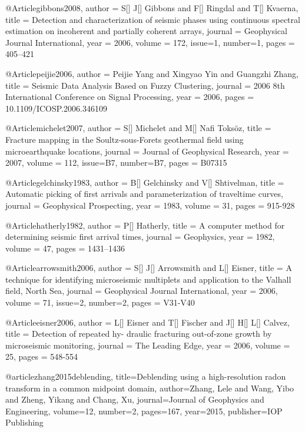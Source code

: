    @Article{gibbons2008,
  author = 	 {S[] J[] Gibbons and F[] Ringdal and T[] Kvaerna},
  title = 	 {Detection and characterization of seismic phases using continuous spectral estimation on incoherent and partially coherent arrays},
  journal = 	 {Geophysical Journal International},
  year = 	 2006,
  volume = 	 172,
  issue=1,
  number=1,
  pages = 	 {405–421}} 
  
   @Article{peijie2006,
  author = 	 {Peijie Yang and Xingyao Yin and Guangzhi Zhang},
  title = 	 {Seismic Data Analysis Based on Fuzzy Clustering},
  journal = 	 {2006 8th International Conference on Signal Processing},
  year = 	 2006,
  pages = 	 {10.1109/ICOSP.2006.346109}} 

    @Article{michelet2007,
  author = 	 {S[] Michelet and M[] Nafi Toks\"{o}z},
  title = 	 {Fracture mapping in the Soultz-sous-Forets geothermal field using microearthquake locations},
  journal = 	 {Journal of Geophysical Research},
  year = 	 2007,
  volume = 	 112,
  issue=B7,
  number=B7,
  pages = 	 {B07315}} 
 
    @Article{gelchinsky1983,
  author = 	 {B[] Gelchinsky and V[] Shtivelman},
  title = 	 {Automatic picking of first arrivals and parameterization of traveltime curves},
  journal = 	 {Geophysical Prospecting},
  year = 	 1983,
  volume = 	 31,
  pages = 	 {915-928}} 

    @Article{hatherly1982,
  author = 	 {P[] Hatherly},
  title = 	 {A computer method for determining seismic first arrival times},
  journal = 	 {Geophysics},
  year = 	 1982,
  volume = 	 47,
  pages = 	 {1431–1436}} 
    
   @Article{arrowsmith2006,
  author = 	 {S[] J[] Arrowsmith and L[] Eisner},
  title = 	 {A technique for identifying microseismic multiplets and application to the Valhall field, North Sea},
  journal = 	 {Geophysical Journal International},
  year = 	 2006,
  volume = 	 71,
  issue=2,
  number=2,
  pages = 	 {V31-V40}} 
  
    @Article{eisner2006,
  author = 	 {L[] Eisner and T[] Fischer and J[] H[] L[] Calvez},
  title = 	 {Detection of repeated hy- draulic fracturing  out-of-zone growth  by microseismic monitoring},
  journal = 	 {The Leading Edge},
  year = 	 2006,
  volume = 	 25,
  pages = 	 {548-554}}
  
  @article{zhang2015deblending,
  title={Deblending using a high-resolution radon transform in a common midpoint domain},
  author={Zhang, Lele and Wang, Yibo and Zheng, Yikang and Chang, Xu},
  journal={Journal of Geophysics and Engineering},
  volume={12},
  number={2},
  pages={167},
  year={2015},
  publisher={IOP Publishing}
}

